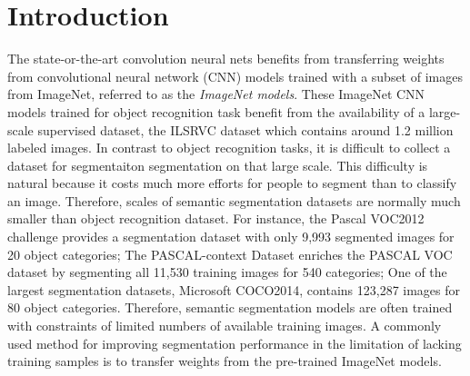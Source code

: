 \section{Introduction}
\label{introduction}



The state-or-the-art convolution neural nets benefits from transferring weights from convolutional neural network (CNN) models trained with a subset of images from ImageNet, referred to as the \textit{ImageNet models}.\cite{long2015fully,chen2016deeplab,he2017mask}
These ImageNet CNN models\cite{krizhevsky2012imagenet,simonyan2014very,szegedy2015going,he2016deep} trained for object recognition task benefit from the availability of a large-scale supervised dataset, the ILSRVC dataset\cite{russakovsky2015imagenet} which contains around 1.2 million labeled images.
In contrast to object recognition tasks, it is difficult to collect a dataset for segmentaiton segmentation on that large scale.
This difficulty is natural because it costs much more efforts for people to segment than to classify an image.
Therefore, scales of semantic segmentation datasets are normally much smaller than object recognition dataset.
For instance, the Pascal VOC2012 challenge\cite{everingham2015pascal} provides a segmentation dataset with only 9,993 segmented images for 20 object categories;
The PASCAL-context Dataset\cite{mottaghi2014role} enriches the PASCAL VOC dataset by segmenting all 11,530 training images for 540 categories;
One of the largest segmentation datasets, Microsoft COCO2014\cite{lin2014microsoft}, contains 123,287 images for 80 object categories.
Therefore, semantic segmentation models are often trained with constraints of limited numbers of available training images.
A commonly used method for improving segmentation performance in the limitation of lacking training samples is to transfer weights from the pre-trained ImageNet models.\cite{long2015fully,chen2016deeplab}


